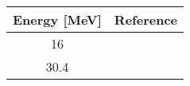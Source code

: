 \begin{tabular}{c c} 
    \toprule 
    \bf{Energy [MeV]} & \bf{Reference} \\
    \midrule
    16 & \cite{Makofske68}\\
    30.4 & \cite{Hardacre71}\\
    \bottomrule
\end{tabular}

